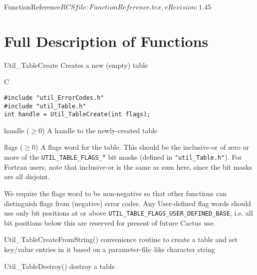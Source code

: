 \begin{cactuspart}{5}{FunctionReference}{$RCSfile: FunctionReference.tex,v $}{$Revision: 1.45 $}
\begin{Lentry}
\end{Lentry}


\section{Full Description of Functions}


\begin{FunctionDescription}{Util\_TableCreate}
\label{Util-TableCreate}
Creates a new (empty) table

\begin{Synopsis}{C}
\begin{verbatim}
#include "util_ErrorCodes.h"
#include "util_Table.h"
int handle = Util_TableCreate(int flags);
\end{verbatim}
\end{Synopsis}

\begin{Result}{handle ($\ge 0$)}
A handle to the newly-created table
\end{Result}

\begin{Parameter}{flags ($\ge 0$)}
A flags word for the table.  This should be the inclusive-or of zero
or more of the \verb|UTIL_TABLE_FLAGS_|* bit masks (defined in
\verb|"util_Table.h"|).  For Fortran users, note that inclusive-or
is the same as sum here, since the bit masks are all disjoint.
\end{Parameter}

\begin{Discussion}
We require the flags word to be non-negative so that other
functions can distinguish flags from (negative) error codes.
\NewPar
Any User-defined flag words should use only bit positions at or above
\verb|UTIL_TABLE_FLAGS_USER_DEFINED_BASE|, i.e. all bit positions
below this are reserved for present of future Cactus use.
\end{Discussion}

\begin{SeeAlso}{Util\_TableCreateFromString()}
convenience routine to create a table and set key/value entries
in it based on a parameter-file--like character string
\end{SeeAlso}
\begin{SeeAlso}{Util\_TableDestroy()}
destroy a table
\end{SeeAlso}


\end{FunctionDescription}
\end{cactuspart}
